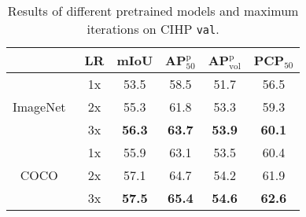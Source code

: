 \documentclass[10pt,twocolumn,letterpaper]{article}
\begin{document}
\begin{table}[t]
\centering
\small
{}
\vspace{.5em}
  \caption{Ablation study on \emph{Parsing Branch Decoupling} (PBD) structure. 4conv denotes four convolutional layers with 3$\times$3 kernels.}
  \label{tab:ablation_pbd}
\vspace{-.8em}
\end{table}



\begin{table}[t]
\centering
\small
\begin{tabular}{c|c|cccc}
& LR & mIoU  &  AP$^\text{p}_\text{50}$ & AP$^\text{p}_\text{vol}$  & PCP$_\text{50}$ \\
 \toprule[0.2em]
\multirow{3}{*}{ImageNet~\cite{Russakovsky_ijcv2015_imagenet}} & 1x & 53.5 & 58.5 & 51.7 & 56.5 \\
                                          & 2x & 55.3 & 61.8 & 53.3 & 59.3 \\
                                          & 3x & \textbf{56.3} & \textbf{63.7} & \textbf{53.9} & \textbf{60.1} \\
\hline
\multirow{3}{*}{COCO~\cite{Lin_eccv2014_coco}}  & 1x & 55.9 & 63.1 & 53.5 & 60.4 \\
                                      & 2x & 57.1 & 64.7 & 54.2 & 61.9 \\
                                      & 3x & \textbf{57.5} & \textbf{65.4} & \textbf{54.6} & \textbf{62.6} \\
\end{tabular}
\vspace{.5em}
  \caption{Results of different pretrained models and maximum iterations on CIHP \texttt{val}.}
  \label{tab:coco_pretrain}
\vspace{-.8em}
\end{table}
\end{document}
